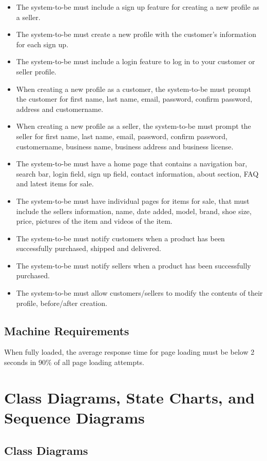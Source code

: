 \begin{itemize}
  \item The system-to-be must include a sign up feature for creating a new profile as a seller.
  \item The system-to-be must create a new profile with the customer's information for each sign up.
  \item The system-to-be must include a login feature to log in to your customer or seller profile.
  \item When creating a new profile as a customer, the system-to-be must prompt the customer for first name, last name, email, password, confirm password, address and customername.
  \item When creating a new profile as a seller, the system-to-be must prompt the seller for first name, last name, email, password, confirm password, customername, business name, business address and business license.
  \item The system-to-be must have a home page that contains a navigation bar, search bar, login field, sign up field, contact information, about section, FAQ and latest items for sale.
  \item The system-to-be must have individual pages for items for sale, that must include the sellers information, name, date added, model, brand, shoe size, price, pictures of the item and videos of the item.
  \item The system-to-be must notify customers when a product has been successfully purchased, shipped and delivered.
  \item The system-to-be must notify sellers when a product has been successfully purchased.
  \item The system-to-be must allow customers/sellers to modify the contents of their profile, before/after creation.
\end{itemize}
\subsection{Machine Requirements}
When fully loaded, the average response time for page loading must be below 2 seconds in 90\% of all page loading attempts.
\section{Class Diagrams, State Charts, and Sequence Diagrams}
\subsection{Class Diagrams}
